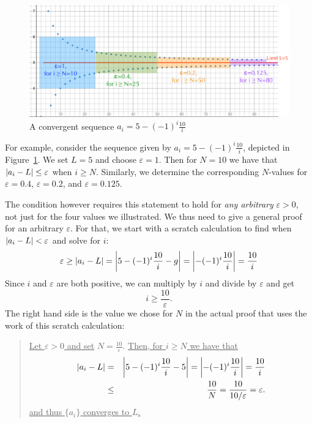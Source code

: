 \begin{figure}[t]
\begin{center}
\includegraphics[width=12cm]{pic/LimitCorral.pdf}
\end{center}
\caption{A convergent sequence $a_i=5-(-1)^i\frac{10}{i}$}
\label{figlimitcorral}
\end{figure}

For example, consider the sequence given by 
$a_i=5-(-1)^i\frac{10}{i}$, depicted in Figure~\ref{figlimitcorral}. We set
$L=5$ and choose $\varepsilon=1$. Then for $N=10$ we have
that $\left|a_i-L\right|\le\varepsilon$ when $i\ge N$. Similarly, we
determine the corresponding $N$-values for $\varepsilon=0.4$,
$\varepsilon=0.2$, and $\varepsilon=0.125$.

The condition however requires this statement to hold for {\em any
arbitrary} $\varepsilon>0$, not just for the four values we illustrated. We
thus need to give a general proof for an arbitrary $\varepsilon$. For that,
we start with a scratch calculation to find when $\left|a_i-L\right|<\varepsilon$
and solve for $i$:
\[
\varepsilon\ge \left|a_i-L\right|=\left|5-(-1)^i\frac{10}{i}-g\right|=\left|-(-1)^i\frac{10}{i}\right|=
\frac{10}{i}
\]
Since $i$ and $\varepsilon$ are both positive, we can multiply by $i$ and
divide by $\varepsilon$ and get
\[
i\ge\frac{10}{\varepsilon}.
\]
The right hand side is the value we chose for $N$ in the actual proof that
uses the work of this scratch calculation:

\begin{quote}
\underline{Let $\varepsilon>0$ and set} $N=\frac{10}{\varepsilon}$.
\underline{Then, for $i\ge N$ we have that}
\begin{eqnarray*}
\left|a_i-L\right|&=&\left|5-(-1)^i\frac{10}{i}-5\right|=\left|-(-1)^i\frac{10}{i}\right|=
\frac{10}{i}\\
&\le&\frac{10}{N}=\frac{10}{10/\varepsilon}=\varepsilon.
\end{eqnarray*}
\underline{and thus $\{a_i\}$ converges to $L$.}
\end{quote}


